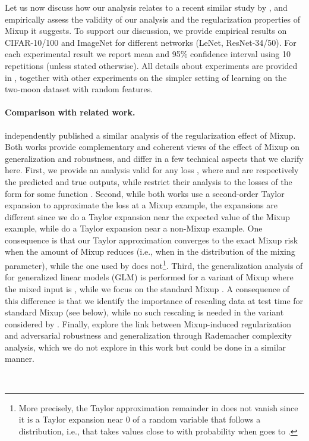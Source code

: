 \documentclass[twoside,11pt]{article}
\newcommand{\rev}[1]{{#1}}
\begin{document}
Let us now discuss \rev{how our analysis relates to a recent similar study by \citet{Zhang2021HowDM}}, and empirically assess the validity of our analysis and the regularization properties of Mixup it suggests.
To support our discussion, we provide empirical results on CIFAR-10/100 and ImageNet for different networks
(LeNet, ResNet-34/50). 
For each experimental result we report mean and 95\% confidence interval using 10 repetitions (unless stated otherwise). 
All details about experiments are provided in , together with other experiments on 
the simpler setting of learning on the two-moon dataset with random features. 

\rev{\paragraph{Comparison with related work.}
\citet{Zhang2021HowDM} independently published a similar analysis of the regularization effect of Mixup. Both works provide complementary and coherent views of the effect of Mixup on generalization and robustness, and differ in a few technical aspects that we clarify here. First, we provide an analysis valid for any loss , where  and  are respectively the predicted and true outputs, while \citet{Zhang2021HowDM} restrict their analysis to the losses of the form  for some function . Second, while both works use a second-order Taylor expansion to approximate the loss at a Mixup example, the expansions are different since we do a Taylor expansion near the expected value of the Mixup example, while \citet[Lemma 3.1]{Zhang2021HowDM} do a Taylor expansion near a non-Mixup example. One consequence is that our Taylor approximation converges to the exact Mixup risk when the amount of Mixup reduces (i.e., when  in the  distribution of the mixing parameter), while the one used by \citet{Zhang2021HowDM} does not\footnote{\rev{More precisely, the Taylor approximation remainder in \citet[Lemma 3.1]{Zhang2021HowDM} does not vanish since it is a Taylor expansion near 0 of a random variable that follows a  distribution, i.e., that takes values close to  with probability  when  goes to .}}. Third, the generalization analysis of \citet{Zhang2021HowDM} for generalized linear models (GLM) is performed for a variant of Mixup where the mixed input is , while we focus on the standard Mixup . A consequence of this difference is that we identify the importance of rescaling data at test time for standard Mixup (see below), while no such rescaling is needed in the variant considered by \citet{Zhang2021HowDM}. Finally, \citet{Zhang2021HowDM} explore the link between Mixup-induced regularization and adversarial robustness and generalization through Rademacher complexity analysis, which we do not explore in this work but could be done in a similar manner.}
\\
\end{document}
